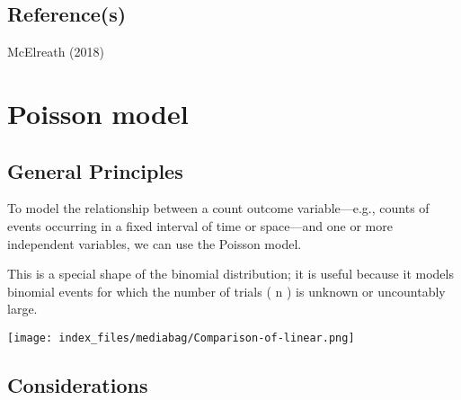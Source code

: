 \documentclass[
  letterpaper,
  DIV=11,
  numbers=noendperiod]{scrreprt}
\begin{document}
\section{Reference(s)}\label{references-5}

McElreath (2018)


\chapter{Poisson model}\label{poisson-model}

\section{General Principles}\label{general-principles-6}

To model the relationship between a count outcome variable---e.g.,
counts of events occurring in a fixed interval of time or space---and
one or more independent variables, we can use the Poisson model.

This is a special shape of the binomial distribution; it is useful
because it models binomial events for which the number of trials ( n )
is unknown or uncountably large.

\texttt{[image: index\_files/mediabag/Comparison-of-linear.png]}

\section{Considerations}\label{considerations-6}
\end{document}
